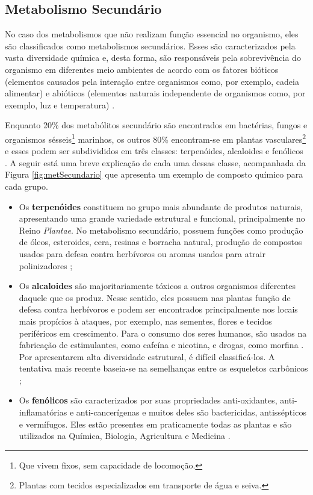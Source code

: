 \subsection{Metabolismo Secundário}

\indent No caso dos metabolismos que não realizam função essencial no organismo, eles são classificados como metabolismos secundários. Esses são caracterizados pela vasta diversidade química e, desta forma, são responsáveis pela sobrevivência do organismo em diferentes meio ambientes de acordo com os fatores bióticos (elementos causados pela interação entre organismos como, por exemplo, cadeia alimentar) e abióticos (elementos naturais independente de organismos como, por exemplo, luz e temperatura) \cite{Cap3schomburg}.

\indent Enquanto 20\% dos metabólitos secundário são encontrados em bactérias, fungos e organismos sésseis\footnote{Que vivem fixos, sem capacidade de locomoção.} marinhos, os outros 80\% encontram-se em plantas vasculares\footnote{Plantas com tecidos especializados em transporte de água e seiva.} \cite{Cap3schomburg} e esses podem ser subdivididos em três classes: terpenóides, alcaloides e fenólicos \cite{kabera14}. A seguir está uma breve explicação de cada uma dessas classe, acompanhada da Figura \ref{fig:metSecundario} que apresenta um exemplo de composto químico para cada grupo.

\begin{itemize}
\item Os \textbf{terpenóides} constituem no grupo mais abundante de produtos naturais, apresentando uma grande variedade estrutural e funcional, principalmente no Reino \textit{Plantae}. No metabolismo secundário, possuem funções como produção de óleos, esteroides, cera, resinas e borracha natural, produção de compostos usados para defesa contra herbívoros ou aromas usados para atrair polinizadores \cite{Cap3schomburg};

\item Os \textbf{alcaloides} são majoritariamente tóxicos a outros organismos diferentes daquele que os produz. Nesse sentido, eles possuem nas plantas função de defesa contra herbívoros e podem ser encontrados principalmente nos locais mais propícios à ataques, por exemplo, nas sementes, flores e tecidos periféricos em crescimento. Para o consumo dos seres humanos, são usados na fabricação de estimulantes, como cafeína e nicotina, e drogas, como morfina \cite{Cap3schomburg}. Por apresentarem alta diversidade estrutural, é difícil classificá-los. A tentativa mais recente baseia-se na semelhanças entre os esqueletos carbônicos \cite{kabera14};

\item Os \textbf{fenólicos} são caracterizados por suas propriedades anti-oxidantes, anti-inflamatórias e anti-cancerígenas e muitos deles são bactericidas, antissépticos e vermífugos. Eles estão presentes em praticamente todas as plantas e são utilizados na Química, Biologia, Agricultura e Medicina \cite{kabera14}.
\end{itemize}

